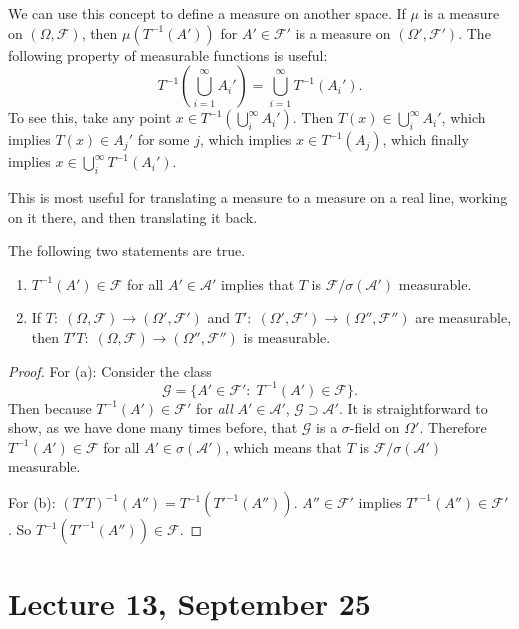 \documentclass[11pt,fleqn]{book} %
\begin{document}
We can use this concept to define a measure on another space. If $\mu$ is a measure on $(\Omega,\mathcal{F})$, then $\mu(T^{-1}(A'))$ for $A' \in \mathcal{F}'$ is a measure on $(\Omega',\mathcal{F}')$. The following property of measurable functions is useful:
\[
	T^{-1} \left( \bigcup_{i=1}^\infty A_i' \right) = \bigcup_{i=1}^\infty T^{-1}(A_i').
\]
To see this, take any point $x \in T^{-1} \left( \bigcup_i^\infty A_i' \right)$. Then $T(x) \in \bigcup_i^\infty A_i'$, which implies $T(x) \in A_j'$ for some $j$, which implies $x \in T^{-1}(A_j)$, which finally implies $x \in \bigcup_i^\infty T^{-1}(A_i')$.

This is most useful for translating a measure to a measure on a real line, working on it there, and then translating it back.

\begin{theorem} \label{thm:measurable-function-props}
	The following two statements are true.
	\begin{enumerate}[label=(\alph*)]
		\item $T^{-1}(A') \in \mathcal{F}$ for all $A' \in \mathcal{A}'$ implies that $T$ is $\mathcal{F}/\sigma(\mathcal{A}')$ measurable.
		\item If $T:\;(\Omega,\mathcal{F}) \to (\Omega',\mathcal{F}')$ and $T':\;(\Omega',\mathcal{F}') \to (\Omega'',\mathcal{F}'')$ are measurable, then $T'T:\;(\Omega,\mathcal{F}) \to (\Omega'',\mathcal{F}'')$ is measurable.
	\end{enumerate}
\end{theorem}

\begin{proof}
	For (a): Consider the class
	\[
		\mathcal{G} = \{A' \in \mathcal{F}':\;T^{-1}(A') \in \mathcal{F}\}.
	\]
	Then because $T^{-1}(A') \in \mathcal{F}'$ for \emph{all} $A' \in \mathcal{A}'$, $\mathcal{G} \supset \mathcal{A}'$. It is straightforward to show, as we have done many times before, that $\mathcal{G}$ is a $\sigma$-field on $\Omega'$. Therefore $T^{-1}(A') \in \mathcal{F}$ for all $A' \in \sigma(\mathcal{A}')$, which means that $T$ is $\mathcal{F}/\sigma(\mathcal{A}')$ measurable.

	For (b): $(T'T)^{-1}(A'') = T^{-1}(T'^{-1}(A''))$. $A'' \in \mathcal{F}'$ implies $T'^{-1}(A'') \in \mathcal{F}'$. So $T^{-1}(T'^{-1}(A'')) \in \mathcal{F}$.
\end{proof}

\section{Lecture 13, September 25}
\end{document}
